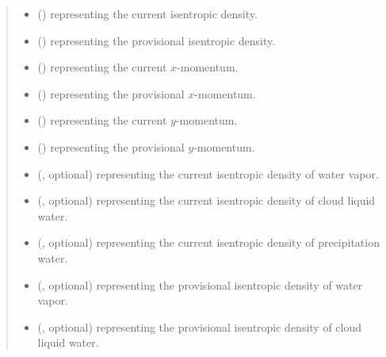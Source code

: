 \documentclass[letterpaper,10pt,english]{sphinxmanual}
\begin{document}
\begin{fulllineitems}
\begin{fulllineitems}
\begin{quote}
\begin{description}
\begin{itemize}
\item {} 
 () \textendash{}  representing the current isentropic density.

\item {} 
 () \textendash{}  representing the provisional isentropic density.

\item {} 
 () \textendash{}  representing the current \(x\)-momentum.

\item {} 
 () \textendash{}  representing the provisional \(x\)-momentum.

\item {} 
 () \textendash{}  representing the current \(y\)-momentum.

\item {} 
 () \textendash{}  representing the provisional \(y\)-momentum.

\item {} 
 (, optional) \textendash{}  representing the current isentropic density of water vapor.

\item {} 
 (, optional) \textendash{}  representing the current isentropic density of cloud liquid water.

\item {} 
 (, optional) \textendash{}  representing the current isentropic density of precipitation water.

\item {} 
 (, optional) \textendash{}  representing the provisional isentropic density of water vapor.

\item {} 
 (, optional) \textendash{}  representing the provisional isentropic density of cloud liquid water.


\end{itemize}
\end{description}
\end{quote}
\end{fulllineitems}
\end{fulllineitems}
\end{document}
